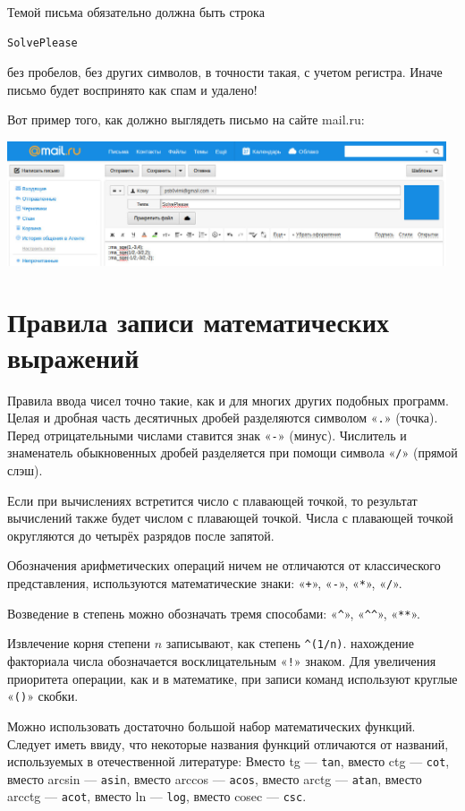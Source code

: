 \documentclass[12pt,a4paper]{article}
\begin{document}
Темой письма обязательно должна быть строка 
\begin{verbatim}
SolvePlease
\end{verbatim}
без пробелов, без других символов, в точности такая, с учетом регистра. Иначе письмо будет воспринято как спам и удалено!

Вот пример того, как должно выглядеть письмо на сайте mail.ru:
\begin{center}
\includegraphics[width=130mm]{ts-email-desc-img1.jpg} 
\end{center}

\section{Правила записи математических выражений}

Правила ввода чисел точно такие, как и для многих других подобных программ. Целая и дробная часть десятичных дробей разделяются символом «\texttt{.}» (точка). Перед отрицательными числами ставится знак «\texttt{-}» (минус). Числитель и знаменатель обыкновенных дробей разделяется при помощи символа «\texttt{/}» (прямой слэш).

Если при вычислениях встретится число с плавающей точкой, то результат вычислений также будет числом с плавающей точкой. Числа с плавающей точкой округляются до четырёх разрядов после запятой.

Обозначения арифметических операций ничем не отличаются от классического представления, используются математические знаки: «\texttt{+}», «\texttt{-}», «\texttt{*}», «\texttt{/}». 

Возведение в степень можно обозначать тремя способами: «\texttt{\^{ }}», «\texttt{\^{ }\^{ }}», «\texttt{**}». 

Извлечение корня степени $n$ записывают, как степень \texttt{\^{ }(1/n)}. нахождение факториала числа обозначается восклицательным «\texttt{!}» знаком. Для увеличения приоритета операции, как и в математике, при записи команд используют круглые «\texttt{()}» скобки.

Можно использовать достаточно большой набор математических функций. Следует иметь ввиду, что некоторые
названия функций отличаются от названий, используемых в отечественной литературе: Вместо tg --- \texttt{tan}, вместо ctg --- \texttt{cot}, вместо arcsin --- \texttt{asin}, вместо arccos --- \texttt{acos}, вместо arctg --- \texttt{atan}, вместо arcctg --- \texttt{acot}, вместо ln --- \texttt{log}, вместо cosec --- \texttt{csc}. 
\end{document}
